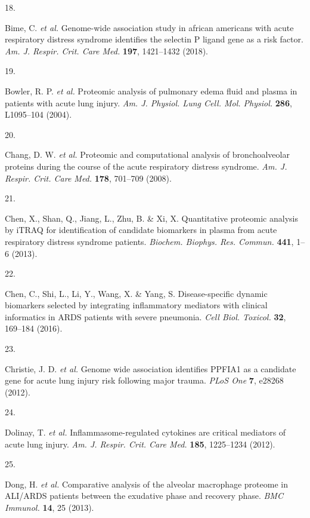 \documentclass[
  11,
  a4paper,
]{article}
\newlength{\cslhangindent}
\newlength{\csllabelwidth}
\newlength{\cslentryspacingunit} %
\newenvironment{CSLReferences}[2] %
 {%
  \setlength{\parindent}{0pt}
  \ifodd #1
  \let\oldpar\par
  \def\par{\hangindent=\cslhangindent\oldpar}
  \fi
  \setlength{\parskip}{#2\cslentryspacingunit}
 }%
 {}
\newcommand{\CSLLeftMargin}[1]{\parbox[t]{\csllabelwidth}{#1}}
\newcommand{\CSLRightInline}[1]{\parbox[t]{\linewidth - \csllabelwidth}{#1}\break}
\begin{document}
\begin{CSLReferences}{0}{0}
\leavevmode{}%
\CSLLeftMargin{18. }%
\CSLRightInline{Bime, C. \emph{et al.} Genome-wide association study in
african americans with acute respiratory distress syndrome identifies
the selectin {P} ligand gene as a risk factor. \emph{Am. J. Respir.
Crit. Care Med.} \textbf{197}, 1421--1432 (2018).}

\leavevmode{}%
\CSLLeftMargin{19. }%
\CSLRightInline{Bowler, R. P. \emph{et al.} Proteomic analysis of
pulmonary edema fluid and plasma in patients with acute lung injury.
\emph{Am. J. Physiol. Lung Cell. Mol. Physiol.} \textbf{286}, L1095--104
(2004).}

\leavevmode{}%
\CSLLeftMargin{20. }%
\CSLRightInline{Chang, D. W. \emph{et al.} Proteomic and computational
analysis of bronchoalveolar proteins during the course of the acute
respiratory distress syndrome. \emph{Am. J. Respir. Crit. Care Med.}
\textbf{178}, 701--709 (2008).}

\leavevmode{}%
\CSLLeftMargin{21. }%
\CSLRightInline{Chen, X., Shan, Q., Jiang, L., Zhu, B. \& Xi, X.
Quantitative proteomic analysis by {iTRAQ} for identification of
candidate biomarkers in plasma from acute respiratory distress syndrome
patients. \emph{Biochem. Biophys. Res. Commun.} \textbf{441}, 1--6
(2013).}

\leavevmode{}%
\CSLLeftMargin{22. }%
\CSLRightInline{Chen, C., Shi, L., Li, Y., Wang, X. \& Yang, S.
Disease-specific dynamic biomarkers selected by integrating inflammatory
mediators with clinical informatics in {ARDS} patients with severe
pneumonia. \emph{Cell Biol. Toxicol.} \textbf{32}, 169--184 (2016).}

\leavevmode{}%
\CSLLeftMargin{23. }%
\CSLRightInline{Christie, J. D. \emph{et al.} Genome wide association
identifies {PPFIA1} as a candidate gene for acute lung injury risk
following major trauma. \emph{PLoS One} \textbf{7}, e28268 (2012).}

\leavevmode{}%
\CSLLeftMargin{24. }%
\CSLRightInline{Dolinay, T. \emph{et al.} Inflammasome-regulated
cytokines are critical mediators of acute lung injury. \emph{Am. J.
Respir. Crit. Care Med.} \textbf{185}, 1225--1234 (2012).}

\leavevmode{}%
\CSLLeftMargin{25. }%
\CSLRightInline{Dong, H. \emph{et al.} Comparative analysis of the
alveolar macrophage proteome in {ALI/ARDS} patients between the
exudative phase and recovery phase. \emph{BMC Immunol.} \textbf{14}, 25
(2013).}


\end{CSLReferences}
\end{document}
